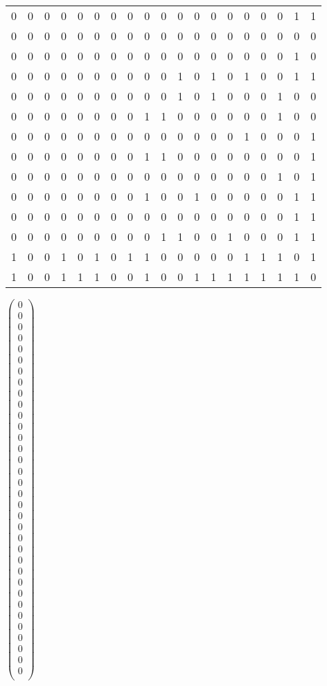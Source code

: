 \begin{table}[!ht]
\begin{tabular}{lllllllllllllllllll}
        0 & 0 & 0 & 0 & 0 & 0 & 0 & 0 & 0 & 0 & 0 & 0 & 0 & 0 & 0 & 0 & 0 & 1 & 1 \\ 
        0 & 0 & 0 & 0 & 0 & 0 & 0 & 0 & 0 & 0 & 0 & 0 & 0 & 0 & 0 & 0 & 0 & 0 & 0 \\ 
        0 & 0 & 0 & 0 & 0 & 0 & 0 & 0 & 0 & 0 & 0 & 0 & 0 & 0 & 0 & 0 & 0 & 1 & 0 \\ 
        0 & 0 & 0 & 0 & 0 & 0 & 0 & 0 & 0 & 0 & 1 & 0 & 1 & 0 & 1 & 0 & 0 & 1 & 1 \\ 
        0 & 0 & 0 & 0 & 0 & 0 & 0 & 0 & 0 & 0 & 1 & 0 & 1 & 0 & 0 & 0 & 1 & 0 & 0 \\ 
        0 & 0 & 0 & 0 & 0 & 0 & 0 & 0 & 1 & 1 & 0 & 0 & 0 & 0 & 0 & 0 & 1 & 0 & 0 \\ 
        0 & 0 & 0 & 0 & 0 & 0 & 0 & 0 & 0 & 0 & 0 & 0 & 0 & 0 & 1 & 0 & 0 & 0 & 1 \\ 
        0 & 0 & 0 & 0 & 0 & 0 & 0 & 0 & 1 & 1 & 0 & 0 & 0 & 0 & 0 & 0 & 0 & 0 & 1 \\ 
        0 & 0 & 0 & 0 & 0 & 0 & 0 & 0 & 0 & 0 & 0 & 0 & 0 & 0 & 0 & 0 & 1 & 0 & 1 \\ 
        0 & 0 & 0 & 0 & 0 & 0 & 0 & 0 & 1 & 0 & 0 & 1 & 0 & 0 & 0 & 0 & 0 & 1 & 1 \\ 
        0 & 0 & 0 & 0 & 0 & 0 & 0 & 0 & 0 & 0 & 0 & 0 & 0 & 0 & 0 & 0 & 0 & 1 & 1 \\ 
        0 & 0 & 0 & 0 & 0 & 0 & 0 & 0 & 0 & 1 & 1 & 0 & 0 & 1 & 0 & 0 & 0 & 1 & 1 \\ 
        1 & 0 & 0 & 1 & 0 & 1 & 0 & 1 & 1 & 0 & 0 & 0 & 0 & 0 & 1 & 1 & 1 & 0 & 1 \\ 
        1 & 0 & 0 & 1 & 1 & 1 & 0 & 0 & 1 & 0 & 0 & 1 & 1 & 1 & 1 & 1 & 1 & 1 & 0 \\ 
    \end{tabular}
\end{table}
\newpage
\newpage
\newpage
$\begin{pmatrix}
0 \\ 
0 \\
0 \\
0 \\
0 \\
0 \\
0 \\
0 \\
0 \\
0 \\
0 \\
0 \\
0 \\
0 \\
0 \\
0 \\
0 \\
0 \\
0 \\
0 \\
0 \\
0 \\
0 \\
0 \\
0 \\
0 \\
0 \\
0 \\
0 \\
0 \\
0 \\
0 \\
0 \\
0 \\
\end{pmatrix}$